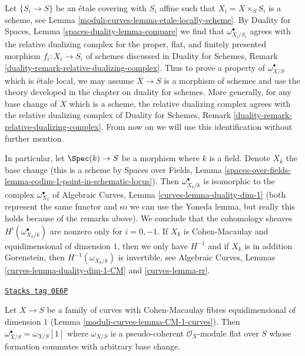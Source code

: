 \medskip\noindent
Let $\{S_i \to S\}$ be an \'etale covering with $S_i$ affine such that
$X_i = X \times_S S_i$ is a scheme, see Lemma \ref{moduli-curves-lemma-etale-locally-scheme}.
By Duality for Spaces, Lemma \ref{spaces-duality-lemma-compare}
we find that $\omega_{X_i/S_i}^\bullet$ agrees with
the relative dualizing complex for the proper, flat, and
finitely presented morphism $f_i : X_i \to S_i$ of schemes
discussed in Duality for Schemes, Remark
\ref{duality-remark-relative-dualizing-complex}.
Thus to prove a property of $\omega_{X/S}^\bullet$
which is \'etale local, we may assume $X \to S$ is a morphism of schemes
and use the theory developed in the chapter on duality for schemes.
More generally, for any base change of $X$ which is a scheme,
the relative dualizing complex agrees with the
relative dualizing complex of Duality for Schemes, Remark
\ref{duality-remark-relative-dualizing-complex}.
From now on we will use this identification without further mention.

\medskip\noindent
In particular, let $\Spec(k) \to S$ be a morphism where $k$ is a field.
Denote $X_k$ the base change (this is a scheme by
Spaces over Fields, Lemma
\ref{spaces-over-fields-lemma-codim-1-point-in-schematic-locus}).
Then $\omega_{X_k/k}^\bullet$ is isomorphic
to the complex $\omega_{X_k}^\bullet$ of
Algebraic Curves, Lemma \ref{curves-lemma-duality-dim-1}
(both represent the same functor and so we can use the Yoneda lemma,
but really this holds because of the remarks above).
We conclude that the cohomology sheaves
$H^i(\omega_{X_k/k}^\bullet)$
are nonzero only for $i = 0, -1$.
If $X_k$ is Cohen-Macaulay and equidimensional of dimension $1$,
then we only have $H^{-1}$ and if $X_k$ is in addition Gorenstein,
then $H^{-1}(\omega_{X_k/k})$ is invertible, see
Algebraic Curves, Lemmas \ref{curves-lemma-duality-dim-1-CM}
and \ref{curves-lemma-rr}.

\begin{lemma}[CM dualizing]
\label{moduli-curves-lemma-CM-dualizing}
\href{https://stacks.math.columbia.edu/tag/0E6P}{\texttt{Stacks tag 0E6P}}

Let $X \to S$ be a family of curves with Cohen-Macaulay fibres
equidimensional of dimension $1$ (Lemma \ref{moduli-curves-lemma-CM-1-curves}).
Then $\omega_{X/S}^\bullet = \omega_{X/S}[1]$ where $\omega_{X/S}$
is a pseudo-coherent $\mathcal{O}_X$-module flat over $S$ whose
formation commutes with arbitrary base change.
\end{lemma}

